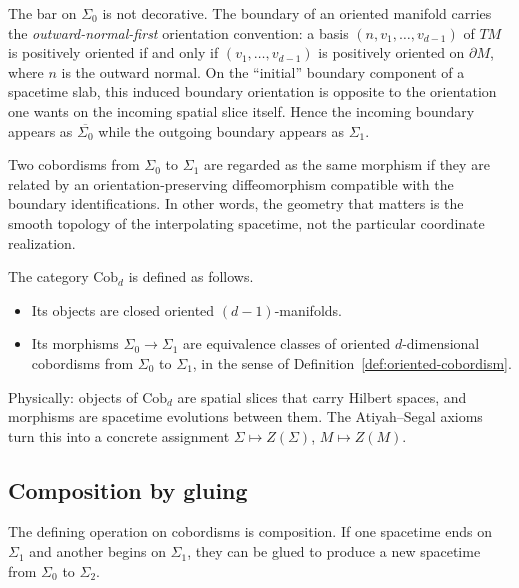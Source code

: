 \begin{remark}\label{rem:incoming-orientation}
The bar on $\Sigma_0$ is not decorative. The boundary of an oriented manifold carries the \emph{outward-normal-first} orientation convention: a basis $(n,v_1,\ldots,v_{d-1})$ of $TM$ is positively oriented if and only if $(v_1,\ldots,v_{d-1})$ is positively oriented on $\partial M$, where $n$ is the outward normal. On the ``initial'' boundary component of a spacetime slab, this induced boundary orientation is opposite to the orientation one wants on the incoming spatial slice itself. Hence the incoming boundary appears as $\overline{\Sigma_0}$ while the outgoing boundary appears as $\Sigma_1$.
\end{remark}

\noindent Two cobordisms from $\Sigma_0$ to $\Sigma_1$ are regarded as the same morphism if they are related by an orientation-preserving diffeomorphism compatible with the boundary identifications. In other words, the geometry that matters is the smooth topology of the interpolating spacetime, not the particular coordinate realization.

\begin{definition}\label{def:Cobd}
The category $\mathrm{Cob}_d$ is defined as follows.
\begin{itemize}
\item Its objects are closed oriented $(d-1)$-manifolds.
\item Its morphisms $\Sigma_0 \to \Sigma_1$ are equivalence classes of oriented $d$-dimensional cobordisms from $\Sigma_0$ to $\Sigma_1$, in the sense of Definition~\ref{def:oriented-cobordism}.
\end{itemize}
\end{definition}

\medskip

\noindent Physically: objects of $\mathrm{Cob}_d$ are spatial slices that carry Hilbert spaces, and morphisms are spacetime evolutions between them. The Atiyah--Segal axioms turn this into a concrete assignment $\Sigma \mapsto Z(\Sigma)$, $M \mapsto Z(M)$.

\subsection{Composition by gluing}

The defining operation on cobordisms is composition. If one spacetime ends on $\Sigma_1$ and another begins on $\Sigma_1$, they can be glued to produce a new spacetime from $\Sigma_0$ to $\Sigma_2$.

